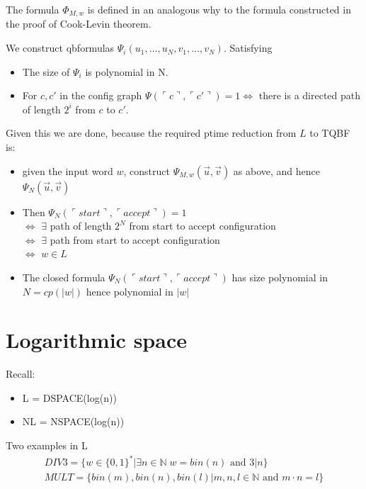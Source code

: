 \documentclass[a4paper,12pt]{article}
\theoremstyle{definition}
\theoremstyle{remark}
\newcommand{\N}{\mathbb{N}}
\begin{document}
The formula $\Phi_{M, w}$ is defined in an analogous why to the formula constructed in the proof of Cook-Levin theorem.

We construct qbformulas $\Psi_i (u_1, \dots, u_N, v_1, \dots, v_N)$. Satisfying
\begin{itemize}
    \item The size of $\Psi_i$ is polynomial in N.
    \item For $c, c'$ in the config graph $\Psi(\ulcorner c \urcorner, \ulcorner c'\urcorner) = 1 \iff $ there is a directed path of length $2^i$ from $c$ to $c'$.
\end{itemize}

Given this we are done, because the required ptime reduction from $L$ to TQBF is:
\begin{itemize}
    \item given the input word $w$, construct $\Psi_{M, w} (\vec{u}, \vec{v})$ as above, and hence $\Psi_N(\vec{u}, \vec{v})$
    \item Then $\Psi_N (\ulcorner start \urcorner, \ulcorner accept \urcorner) = 1$ \\
    $\iff$ $\exists$ path of length $2^N$ from start to accept configuration \\
    $\iff$ $\exists$ path from start to accept configuration \\
    $\iff$ $w \in L$
    \item The closed formula $\Psi_N (\ulcorner start \urcorner, \ulcorner accept \urcorner)$ has size polynomial in $N = cp(|w|)$ hence polynomial in $|w|$
\end{itemize}







\newpage
\section{Logarithmic space}
Recall:
\begin{itemize}
    \item L = DSPACE(log(n))
    \item NL = NSPACE(log(n))
\end{itemize}

Two examples in L
\begin{gather*}
    DIV3 = \{w \in \{0, 1\}^* | \exists n \in \N \; w = bin(n) \text{ and } 3|n\} \\
    MULT = \{bin(m), bin(n), bin(l) | m, n, l \in \N \text{ and } m \cdot n = l\}
\end{gather*}
\end{document}
